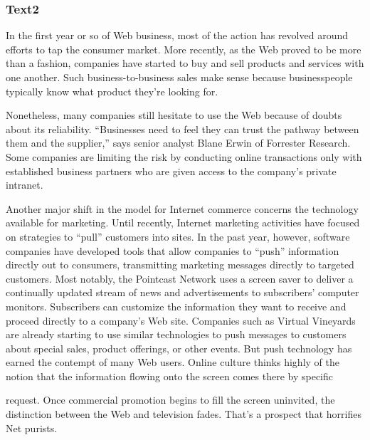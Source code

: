 \documentclass[a4paper]{article}
\begin{document}
\subsubsection{Text2}

\par
In the first year or so of Web business, most of the action has revolved around efforts to tap the consumer market. More recently, as the Web proved to be more than a fashion, companies have started to buy and sell products and services with one another. Such business-to-business sales make sense because businesspeople typically know what product they’re looking for.

\par
Nonetheless, many companies still hesitate to use the Web because of doubts about its reliability. “Businesses need to feel they can trust the pathway between them and the supplier,” says senior analyst Blane Erwin of Forrester Research. Some companies are limiting the risk by conducting online transactions only with established business partners who are given access to the company’s private intranet.

\par
Another major shift in the model for Internet commerce concerns the technology available for marketing. Until recently, Internet marketing activities have focused on strategies to “pull” customers into sites. In the past year, however, software companies have developed tools that allow companies to “push” information directly out to consumers, transmitting marketing messages directly to targeted customers. Most notably, the Pointcast Network uses a screen saver to deliver a continually updated stream of news and advertisements to subscribers’ computer monitors. Subscribers can customize the information they want to receive and proceed directly to a company’s Web site. Companies such as Virtual Vineyards are already starting to use similar technologies to push messages to customers about special sales, product offerings, or other events. But push technology has earned the contempt of many Web users. Online culture thinks highly of the notion that the information flowing onto the screen comes there by specific

\par
request. Once commercial promotion begins to fill the screen uninvited, the distinction between the Web and television fades. That’s a prospect that horrifies Net purists.
\end{document}

